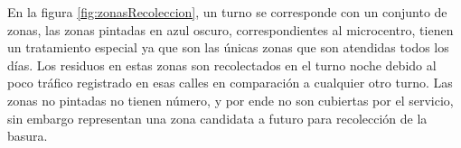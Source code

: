 En la figura \ref{fig:zonasRecoleccion}, un turno se corresponde con un conjunto de zonas, las zonas pintadas en azul oscuro, correspondientes al microcentro, tienen un tratamiento especial ya que son las únicas zonas que son atendidas todos los días. Los residuos en estas zonas son recolectados en el turno noche debido al poco tráfico registrado en esas calles en comparación a cualquier otro turno. Las zonas no pintadas no tienen número, y por ende no son cubiertas por el servicio, sin embargo representan una zona candidata a futuro para recolección de la basura.
